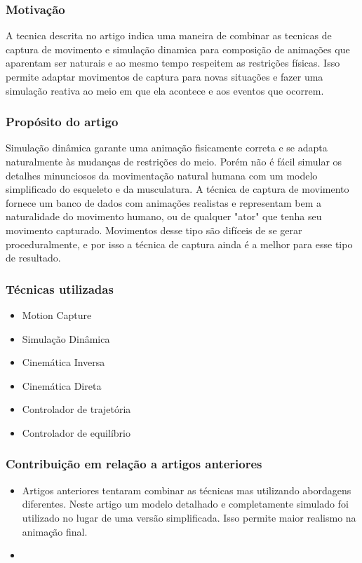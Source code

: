 \subsubsection{Motivação}
A tecnica descrita no artigo indica uma maneira de combinar as tecnicas de captura de movimento e simulação dinamica para composição de animações que aparentam ser naturais e ao mesmo tempo respeitem as restrições físicas. Isso permite adaptar movimentos de captura para novas situações e fazer uma simulação reativa ao meio em que ela acontece e aos eventos que ocorrem.
\subsubsection{Propósito do artigo}
Simulação dinâmica garante uma animação fisicamente correta e se adapta naturalmente às mudanças de restrições do meio. Porém não é fácil simular os detalhes minunciosos da movimentação natural humana com um modelo simplificado do esqueleto e da musculatura.
A técnica de captura de movimento fornece um banco de dados com animações realistas e representam bem a naturalidade do movimento humano, ou de qualquer "ator" que tenha seu movimento capturado. Movimentos desse tipo são difíceis de se gerar proceduralmente, e por isso a técnica de captura ainda é a melhor para esse tipo de resultado.
\subsubsection{Técnicas utilizadas} 
\begin{itemize}
  \item Motion Capture
  \item Simulação Dinâmica
  \item Cinemática Inversa
  \item Cinemática Direta
  \item Controlador de trajetória
  \item Controlador de equilíbrio
\end{itemize}  

\subsubsection{Contribuição em relação a artigos anteriores} %
 \begin{itemize}
   \item Artigos anteriores tentaram combinar as técnicas mas utilizando abordagens diferentes. Neste artigo um modelo detalhado e completamente simulado foi utilizado no lugar de uma versão simplificada. Isso permite maior realismo na animação final.
   \item
 \end{itemize}  

